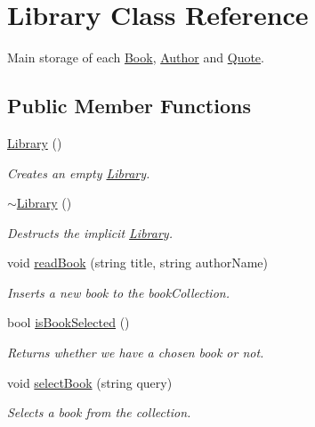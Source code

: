 \hypertarget{class_library}{}\section{Library Class Reference}
\label{class_library}


Main storage of each \hyperlink{class_book}{Book}, \hyperlink{class_author}{Author} and \hyperlink{class_quote}{Quote}.  


\subsection*{Public Member Functions}
\begin{DoxyCompactItemize}
\item 
\hyperlink{class_library_a82338219d8bf51962ff5f60a0db21b19}{Library} ()
\begin{DoxyCompactList}\small\item\em Creates an empty \hyperlink{class_library}{Library}. \end{DoxyCompactList}\item 
\hyperlink{class_library_a62120f28a9b50cc5b151d868e42ab936}{$\sim$\+Library} ()
\begin{DoxyCompactList}\small\item\em Destructs the implicit \hyperlink{class_library}{Library}. \end{DoxyCompactList}\item 
void \hyperlink{class_library_a2e296d2dc8e0292f0ea6d8d3511f7ec5}{read\+Book} (string title, string author\+Name)
\begin{DoxyCompactList}\small\item\em Inserts a new book to the book\+Collection. \end{DoxyCompactList}\item 
bool \hyperlink{class_library_a04ff0757054c2813e89036cdd3f7f91f}{is\+Book\+Selected} ()
\begin{DoxyCompactList}\small\item\em Returns whether we have a chosen book or not. \end{DoxyCompactList}\item 
void \hyperlink{class_library_a6dd541a183a89a4d35a80834ed9d8d71}{select\+Book} (string query)
\begin{DoxyCompactList}\small\item\em Selects a book from the collection. \end{DoxyCompactList}\item 

\end{DoxyCompactItemize}
